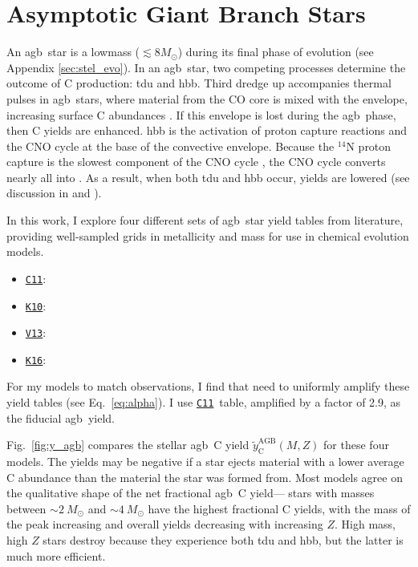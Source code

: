 \documentclass[12pt,oneside,letterpaper]{report}
\newcommand{\agb}{\gls{agb}}
\newcommand{\cxi}{\texttt{\hyperlink{C11}{C11}}}
\newcommand{\kx}{\texttt{\hyperlink{K10}{K10}}}
\newcommand{\kxvi}{\texttt{\hyperlink{K16}{K16}}}
\newcommand{\vxiii}{\texttt{\hyperlink{V13}{V13}}}
\newcommand{\sun}{\odot}
\newcommand{\about}[1]{${\sim} #1$}
\begin{document}
\section{Asymptotic Giant Branch Stars}\label{sec:agb}


An \agb\ star is a \gls{lowmass} ($\lesssim 8 M_{\sun}$) during its final phase of evolution (see Appendix \ref{sec:stel_evo}).  In an \agb\ star, two competing processes determine the outcome of C production: \gls{tdu} and \gls{hbb}.  Third dredge up accompanies thermal pulses in \agb\ stars, where material from the CO core is mixed with the envelope, increasing surface C abundances \citep{KL14}. If this envelope is lost during the \agb\ phase, then C yields are enhanced.
\gls{hbb} is the activation of proton capture reactions and the CNO cycle%
at the base of the convective envelope. Because the $^{14}$N proton capture is the slowest component of the CNO cycle \citep{solar-fusion}, the CNO cycle converts nearly all  into .
As a result, when both \gls{tdu} and \gls{hbb} occur,  yields are lowered (see discussion in \citealt{james+23} and \citealt{ventura+13}).

    In this work, I explore four different sets of \agb\ star yield tables from literature, providing well-sampled grids in \gls{metallicity} and mass for use in chemical evolution models. 
\begin{itemize}
    \item \cxi: \citet{cristallo+11, cristallo+15}
    \item \kx: \citet{karakas10}
    \item \vxiii: \citet{ventura+13,ventura+14,ventura+18, ventura+20}
    \item \kxvi: \citet{KL16, karakas+18}
\end{itemize}
For my models to match observations, I find that need to uniformly amplify these yield tables (see Eq.~\ref{eq:alpha}). I use \cxi\ table, amplified by a factor of 2.9, as the fiducial \agb\ yield.

Fig.~\ref{fig:y_agb} compares the stellar \agb\ C yield $\tilde{y}_\text{C}^\text{AGB}(M, Z)$ for these four models.
The yields may be negative if a star ejects material with a lower average C abundance than the material the star was formed from.
Most models agree on the qualitative shape of the net fractional \agb\ C yield---%
stars with masses between \about{2~M_\odot} and \about{4~M_\odot} have the highest fractional C yields, with the mass of the peak increasing and overall yields decreasing with increasing $Z$.  High mass, high $Z$ stars destroy  because they experience both \gls{tdu} and \gls{hbb}, but the latter is much more efficient.
\end{document}
